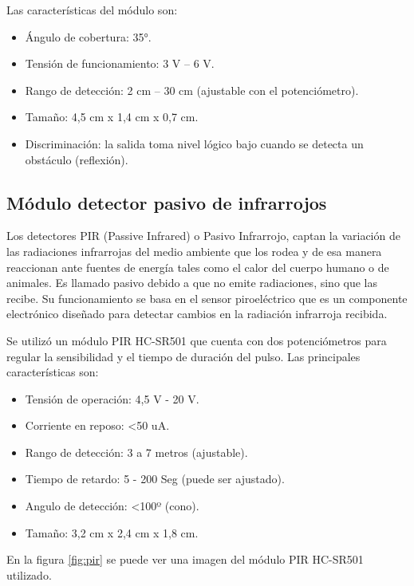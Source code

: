 Las características del módulo son:
\begin{itemize}
	\item Ángulo de cobertura: 35°.
	\item Tensión de funcionamiento: 3 V – 6 V.
	\item Rango de detección: 2 cm – 30 cm (ajustable con el potenciómetro).
	\item Tamaño: 4,5 cm x 1,4 cm x 0,7 cm. 
	\item Discriminación: la salida toma nivel lógico bajo cuando se detecta un obstáculo (reflexión).
\end{itemize}



\subsection{Módulo detector pasivo de infrarrojos}
Los detectores PIR (Passive Infrared) o Pasivo Infrarrojo, captan la variación de las radiaciones infrarrojas del medio ambiente que los rodea y de esa manera reaccionan ante fuentes de energía tales como el calor del cuerpo humano o de animales. Es llamado pasivo debido a que no emite radiaciones, sino que las recibe. Su funcionamiento se basa en el sensor piroeléctrico que es un componente electrónico diseñado para detectar cambios en la radiación infrarroja recibida. 

Se utilizó un módulo PIR HC-SR501 \citep{PIR} que cuenta con dos potenciómetros para regular la sensibilidad y el tiempo de duración del pulso. Las principales características son:

\begin{itemize}
	\item Tensión de operación: 4,5 V - 20 V.
	\item Corriente en reposo: <50 uA.
	\item Rango de detección: 3 a 7 metros (ajustable).
	\item Tiempo de retardo: 5 - 200 Seg (puede ser ajustado).
	\item Angulo de detección: <100º (cono).
	\item Tamaño: 3,2 cm x 2,4 cm x 1,8 cm.
\end{itemize}

En la figura \ref{fig:pir} se puede ver una imagen del módulo PIR HC-SR501 utilizado.

